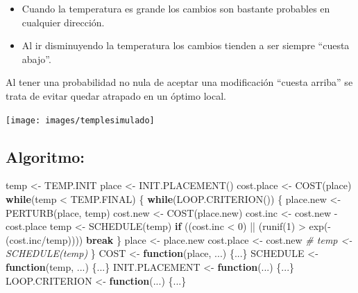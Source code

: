 \documentclass[
]{book}
\newenvironment{Shaded}{\begin{snugshade}}{\end{snugshade}}
\newcommand{\CommentTok}[1]{\textcolor[rgb]{0.56,0.35,0.01}{\textit{#1}}}
\newcommand{\ControlFlowTok}[1]{\textcolor[rgb]{0.13,0.29,0.53}{\textbf{#1}}}
\newcommand{\DecValTok}[1]{\textcolor[rgb]{0.00,0.00,0.81}{#1}}
\newcommand{\FunctionTok}[1]{\textcolor[rgb]{0.00,0.00,0.00}{#1}}
\newcommand{\NormalTok}[1]{#1}
\newcommand{\OtherTok}[1]{\textcolor[rgb]{0.56,0.35,0.01}{#1}}
\newcommand{\SpecialCharTok}[1]{\textcolor[rgb]{0.00,0.00,0.00}{#1}}
\theoremstyle{break}
\theoremstyle{definition}
\theoremstyle{definition}
\theoremstyle{definition}
\theoremstyle{definition}
\theoremstyle{remark}
\begin{document}
\begin{itemize}
\item
  Cuando la temperatura es grande los cambios son bastante
  probables en cualquier dirección.
\item
  Al ir disminuyendo la temperatura los cambios tienden a ser
  siempre ``cuesta abajo''.
\end{itemize}

Al tener una probabilidad no nula de aceptar una modificación
``cuesta arriba'' se trata de evitar quedar atrapado en un
óptimo local.

\begin{center}\texttt{[image: images/templesimulado]} \end{center}

\hypertarget{algoritmo-1}{%
\subsection{Algoritmo:}\label{algoritmo-1}}

\begin{Shaded}
\begin{Highlighting}[]
\NormalTok{temp }\OtherTok{\textless{}{-}}\NormalTok{ TEMP.INIT}
\NormalTok{place }\OtherTok{\textless{}{-}} \FunctionTok{INIT.PLACEMENT}\NormalTok{()}
\NormalTok{cost.place }\OtherTok{\textless{}{-}} \FunctionTok{COST}\NormalTok{(place)}
\ControlFlowTok{while}\NormalTok{(temp }\SpecialCharTok{\textless{}}\NormalTok{ TEMP.FINAL) \{}
  \ControlFlowTok{while}\NormalTok{(}\FunctionTok{LOOP.CRITERION}\NormalTok{()) \{}
\NormalTok{    place.new }\OtherTok{\textless{}{-}} \FunctionTok{PERTURB}\NormalTok{(place, temp)}
\NormalTok{    cost.new }\OtherTok{\textless{}{-}} \FunctionTok{COST}\NormalTok{(place.new)}
\NormalTok{    cost.inc }\OtherTok{\textless{}{-}}\NormalTok{ cost.new }\SpecialCharTok{{-}}\NormalTok{ cost.place}
\NormalTok{    temp }\OtherTok{\textless{}{-}} \FunctionTok{SCHEDULE}\NormalTok{(temp)}
    \ControlFlowTok{if}\NormalTok{ ((cost.inc }\SpecialCharTok{\textless{}} \DecValTok{0}\NormalTok{) }\SpecialCharTok{||}\NormalTok{ (}\FunctionTok{runif}\NormalTok{(}\DecValTok{1}\NormalTok{) }\SpecialCharTok{\textgreater{}} \FunctionTok{exp}\NormalTok{(}\SpecialCharTok{{-}}\NormalTok{(cost.inc}\SpecialCharTok{/}\NormalTok{temp)))) }\ControlFlowTok{break}
\NormalTok{  \}}
\NormalTok{  place }\OtherTok{\textless{}{-}}\NormalTok{ place.new}
\NormalTok{  cost.place }\OtherTok{\textless{}{-}}\NormalTok{ cost.new}
  \CommentTok{\# temp \textless{}{-} SCHEDULE(temp)}
\NormalTok{\}}
\NormalTok{COST }\OtherTok{\textless{}{-}} \ControlFlowTok{function}\NormalTok{(place, ...) \{...\}}
\NormalTok{SCHEDULE }\OtherTok{\textless{}{-}} \ControlFlowTok{function}\NormalTok{(temp, ...) \{...\}}
\NormalTok{INIT.PLACEMENT }\OtherTok{\textless{}{-}} \ControlFlowTok{function}\NormalTok{(...) \{...\}}
\NormalTok{LOOP.CRITERION }\OtherTok{\textless{}{-}} \ControlFlowTok{function}\NormalTok{(...) \{...\}}
\end{Highlighting}
\end{Shaded}
\end{document}
